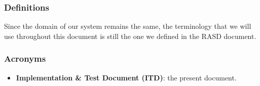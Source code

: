 \subsubsection{Definitions}

Since the domain of our system remains the same, the terminology that we will use throughout this document is still the one we defined in the RASD document.

\subsubsection{Acronyms}

\begin{itemize}
\item \textbf{Implementation \& Test Document (ITD)}: the present document.
\end{itemize}


